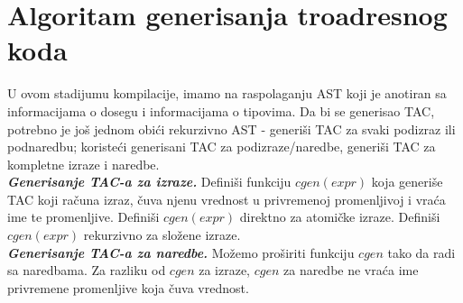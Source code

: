 \documentclass[10pt]{extarticle}
\begin{document}
\section{Algoritam generisanja troadresnog koda}
\noindent
U ovom stadijumu kompilacije, imamo na raspolaganju AST koji je anotiran sa informacijama o dosegu i informacijama o tipovima. Da bi se generisao TAC, potrebno je još jednom obići rekurzivno AST - generiši TAC za svaki podizraz ili podnaredbu; koristeći generisani TAC za podizraze/naredbe, generiši TAC za kompletne izraze i naredbe.\\
\textit{\textbf{Generisanje TAC-a za izraze.}} Definiši funkciju $cgen(expr)$ koja generiše TAC koji računa izraz, čuva njenu vrednost u privremenoj promenljivoj i vraća ime te promenljive. Definiši $cgen(expr)$ direktno za atomičke izraze. Definiši $cgen(expr)$ rekurzivno za složene izraze.\\
\textit{\textbf{Generisanje TAC-a za naredbe.}} Možemo proširiti funkciju $cgen$ tako da radi sa naredbama. Za razliku od $cgen$ za izraze, $cgen$ za naredbe ne vraća ime privremene promenljive koja čuva vrednost.
\newpage
\end{document}
